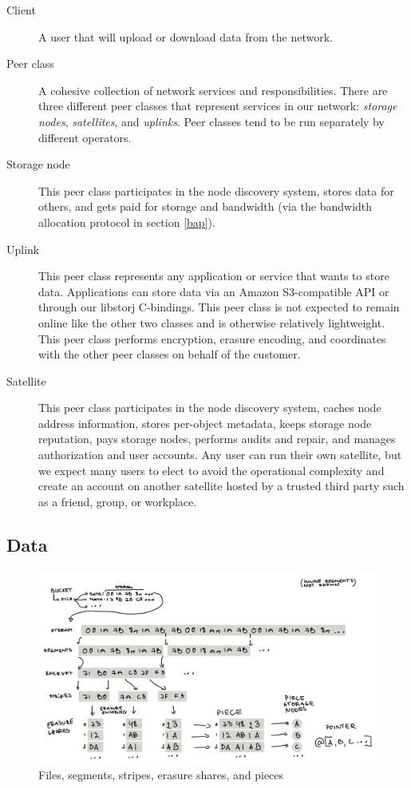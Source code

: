 \documentclass[11pt,fleqn,openany]{book}
\begin{document}
\begin{description}
\item[Client] A user that will upload or download data from the network.

\item[Peer class] A cohesive collection of network services and
  responsibilities. There are three different peer classes that represent
  services in our network: {\em storage nodes}, {\em satellites}, and {\em uplinks}.
  Peer classes tend to be run separately by different operators.

\item[Storage node] This peer class participates in the node discovery
  system, stores data for others, and gets paid for storage and bandwidth
  (via the bandwidth allocation protocol in section \ref{bap}).

\item[Uplink] This peer class represents any application or
  service that wants to store data. Applications can store data via an
  Amazon S3-compatible API or through our libstorj C-bindings. This peer class
  is not expected to remain online like the other two classes and is otherwise
  relatively lightweight. This peer class performs encryption, erasure encoding,
  and coordinates with the other peer classes on behalf of the customer.

\item[Satellite] This peer class participates in the node discovery system,
  caches node address information, stores per-object metadata, keeps storage
  node reputation, pays storage nodes, performs audits and repair, and manages
  authorization and user accounts.
  Any user can run their own satellite, but we expect many users
  to elect to avoid the operational complexity and create an account on
  another satellite hosted by a trusted third party such as a friend, group, or
  workplace.
\end{description}

\subsection{Data}

\begin{figure}
\centering
\includegraphics[width=\textwidth]{diagram-drafts/data-flow-diagram.png}
\caption{Files, segments, stripes, erasure shares, and pieces}
\end{figure}
\end{document}
